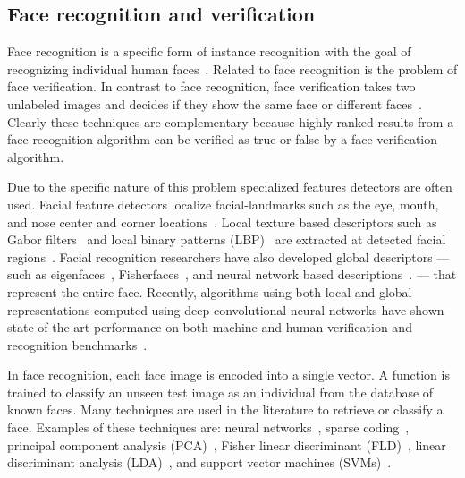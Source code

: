     \subsection{Face recognition and verification}
        Face recognition is a specific form of instance recognition with the goal of recognizing individual human
        faces~\cite{zhao_face_2003, huang_labeled_2007}. Related to face recognition is the problem of face
        verification. In contrast to face recognition, face verification takes two unlabeled images and decides if
        they show the same face or different faces~\cite{taigman_deepface_2014}. Clearly these techniques are
        complementary because highly ranked results from a face recognition algorithm can be verified as true or
        false by a face verification algorithm.

        Due to the specific nature of this problem specialized features detectors are often used. Facial feature
        detectors localize facial-landmarks such as the eye, mouth, and nose center and corner
        locations~\cite{dantone_real_time_2012, berg_tom_vs_pete_2012}. Local texture based descriptors such as Gabor
        filters~\cite{liu_gabor_2002, zhang_histogram_2007, shen_review_2006} and local binary patterns
        (LBP)~\cite{ahonen_face_2006, chen_blessing_2013} are extracted at detected facial
        regions~\cite{belhumeur_localizing_2011}. Facial recognition researchers have also developed global
        descriptors --- such as eigenfaces~\cite{turk_eigenfaces_1991},
        Fisherfaces~\cite{belhumeur_eigenfaces_1997}, and neural network based
        descriptions~\cite{lawrence_face_1997, taigman_deepface_2014}. --- that represent the entire face.
        Recently, algorithms using both local and global representations computed using deep convolutional neural
        networks have shown state-of-the-art performance on both machine and human verification and recognition
        benchmarks~\cite{taigman_deepface_2014}.

        In face recognition, each face image is encoded into a single vector. A function is trained to classify an
        unseen test image as an individual from the database of known faces. Many techniques are used in the
        literature to retrieve or classify a face. Examples of these techniques are: neural
        networks~\cite{turk_eigenfaces_1991, taigman_deepface_2014}, sparse coding~\cite{wright_robust_2009,
        jiang_label_2013}, principal component analysis (PCA)~\cite{craw_face_1992}, Fisher linear discriminant
        (FLD)~\cite{liu_robust_2000}, linear discriminant analysis (LDA)~\cite{lu_face_2003}, and support vector
        machines (SVMs)~\cite{phillips_support_1998, levy_svm_minus_2013}.

